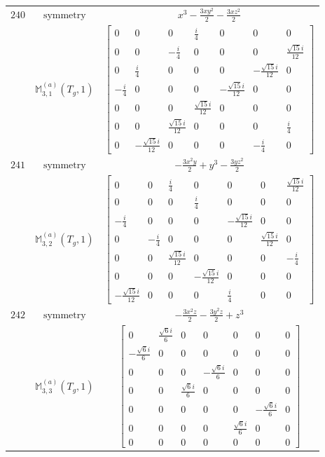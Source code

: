 \documentclass[fleqn,8pt,landscape]{jsarticle}
\begin{document}
\begin{longtable}{ccc}
$ 240 $ & $ \text{symmetry} $ & $ x^{3} - \frac{3 x y^{2}}{2} - \frac{3 x z^{2}}{2} $ \\
$  $ & $ \mathbb{M}_{3,1}^{(a)}(T_{g},1) $ & $ \begin{bmatrix} 0 & 0 & 0 & \frac{i}{4} & 0 & 0 & 0 \\ 0 & 0 & - \frac{i}{4} & 0 & 0 & 0 & \frac{\sqrt{15} i}{12} \\ 0 & \frac{i}{4} & 0 & 0 & 0 & - \frac{\sqrt{15} i}{12} & 0 \\ - \frac{i}{4} & 0 & 0 & 0 & - \frac{\sqrt{15} i}{12} & 0 & 0 \\ 0 & 0 & 0 & \frac{\sqrt{15} i}{12} & 0 & 0 & 0 \\ 0 & 0 & \frac{\sqrt{15} i}{12} & 0 & 0 & 0 & \frac{i}{4} \\ 0 & - \frac{\sqrt{15} i}{12} & 0 & 0 & 0 & - \frac{i}{4} & 0 \end{bmatrix} $ \\ \hline
$ 241 $ & $ \text{symmetry} $ & $ - \frac{3 x^{2} y}{2} + y^{3} - \frac{3 y z^{2}}{2} $ \\
$  $ & $ \mathbb{M}_{3,2}^{(a)}(T_{g},1) $ & $ \begin{bmatrix} 0 & 0 & \frac{i}{4} & 0 & 0 & 0 & \frac{\sqrt{15} i}{12} \\ 0 & 0 & 0 & \frac{i}{4} & 0 & 0 & 0 \\ - \frac{i}{4} & 0 & 0 & 0 & - \frac{\sqrt{15} i}{12} & 0 & 0 \\ 0 & - \frac{i}{4} & 0 & 0 & 0 & \frac{\sqrt{15} i}{12} & 0 \\ 0 & 0 & \frac{\sqrt{15} i}{12} & 0 & 0 & 0 & - \frac{i}{4} \\ 0 & 0 & 0 & - \frac{\sqrt{15} i}{12} & 0 & 0 & 0 \\ - \frac{\sqrt{15} i}{12} & 0 & 0 & 0 & \frac{i}{4} & 0 & 0 \end{bmatrix} $ \\ \hline
$ 242 $ & $ \text{symmetry} $ & $ - \frac{3 x^{2} z}{2} - \frac{3 y^{2} z}{2} + z^{3} $ \\
$  $ & $ \mathbb{M}_{3,3}^{(a)}(T_{g},1) $ & $ \begin{bmatrix} 0 & \frac{\sqrt{6} i}{6} & 0 & 0 & 0 & 0 & 0 \\ - \frac{\sqrt{6} i}{6} & 0 & 0 & 0 & 0 & 0 & 0 \\ 0 & 0 & 0 & - \frac{\sqrt{6} i}{6} & 0 & 0 & 0 \\ 0 & 0 & \frac{\sqrt{6} i}{6} & 0 & 0 & 0 & 0 \\ 0 & 0 & 0 & 0 & 0 & - \frac{\sqrt{6} i}{6} & 0 \\ 0 & 0 & 0 & 0 & \frac{\sqrt{6} i}{6} & 0 & 0 \\ 0 & 0 & 0 & 0 & 0 & 0 & 0 \end{bmatrix} $ \\ \hline

\end{longtable}
\end{document}

